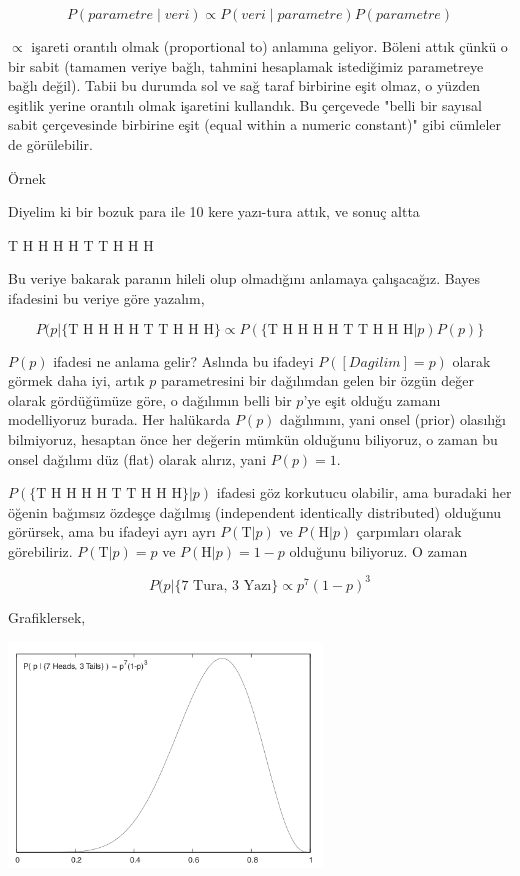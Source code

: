 \documentclass[12pt,fleqn]{article}\usepackage{../../common}
\begin{document}
$$ P(parametre \mid veri ) \propto P(veri \mid parametre)P(parametre) $$

$\propto$ işareti orantılı olmak (proportional to) anlamına geliyor. Böleni
attık çünkü o bir sabit (tamamen veriye bağlı, tahmini hesaplamak
istediğimiz parametreye bağlı değil). Tabii bu durumda sol ve sağ taraf
birbirine eşit olmaz, o yüzden eşitlik yerine orantılı olmak işaretini
kullandık. Bu çerçevede "belli bir sayısal sabit çerçevesinde birbirine
eşit (equal within a numeric constant)" gibi cümleler de görülebilir. 

Örnek

Diyelim ki bir bozuk para ile 10 kere yazı-tura attık, ve sonuç altta

T H H H H T T H H H

Bu veriye bakarak paranın hileli olup olmadığını anlamaya
çalışacağız. Bayes ifadesini bu veriye göre yazalım,

$$ P(p | \{ \textrm{T H H H H T T H H H} \} \propto 
P(\{ \textrm{T H H H H T T H H H} | p) P(p) \}
$$

$P(p)$ ifadesi ne anlama gelir? Aslında bu ifadeyi $P([Dagilim] = p)$ olarak
görmek daha iyi, artık $p$ parametresini bir dağılımdan gelen bir özgün değer
olarak gördüğümüze göre, o dağılımın belli bir $p$'ye eşit olduğu zamanı
modelliyoruz burada. Her halükarda $P(p)$ dağılımını, yani onsel (prior)
olasılığı bilmiyoruz, hesaptan önce her değerin mümkün olduğunu biliyoruz, o
zaman bu onsel dağılımı düz (flat) olarak alırız, yani $P(p) = 1$.

$P( \{\textrm{T H H H H T T H H H} \} | p)$ ifadesi göz korkutucu olabilir, ama
buradaki her öğenin bağımsız özdeşçe dağılmış (independent identically
distributed) olduğunu görürsek, ama bu ifadeyi ayrı ayrı
$P( \textrm{T} | p)$ ve $P( \textrm{H} | p)$ çarpımları olarak
görebiliriz. $P( \textrm{T} | p) = p$ ve $P(  \textrm{H} | p)=1-p$ olduğunu
biliyoruz. O zaman

$$
P(p | \{ \textrm{7 Tura, 3 Yazı} \} \propto
p^7(1-p)^3
$$

Grafiklersek, 

\includegraphics[height=6cm]{stat_appendix_01.png}
\end{document}
